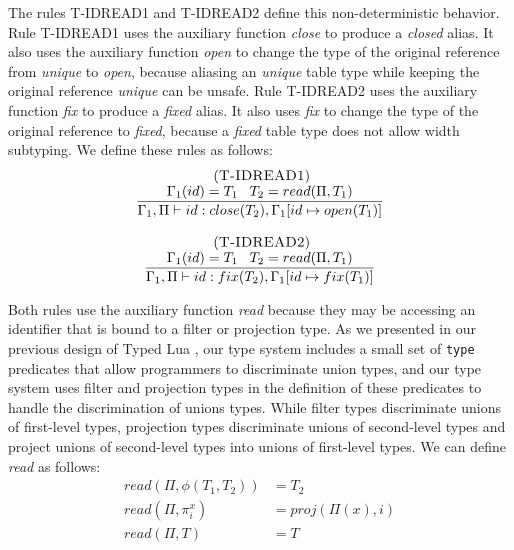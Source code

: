 \documentclass{sigplanconf}
\newcommand{\mylabel}[1]{\; (\textsc{#1})}
\newcommand{\env}{\Gamma}
\newcommand{\penv}{\Pi}
\begin{document}
The rules \textsc{T-IDREAD1} and \textsc{T-IDREAD2} define this non-deterministic behavior.
Rule \textsc{T-IDREAD1} uses the auxiliary function \emph{close} to
produce a \emph{closed} alias.
It also uses the auxiliary function \emph{open} to change the type of
the original reference from \emph{unique} to \emph{open},
because aliasing an \emph{unique} table type while keeping the original
reference \emph{unique} can be unsafe.
Rule \textsc{T-IDREAD2} uses the auxiliary function \emph{fix} to
produce a \emph{fixed} alias.
It also uses \emph{fix} to change the type of the original reference
to \emph{fixed}, because a \emph{fixed} table type does not allow
width subtyping.
We define these rules as follows:
\[
\begin{array}{c}
\begin{array}{c}
\mylabel{T-IDREAD1}\\
\dfrac{\env_{1}(id) = T_{1} \;\;\; T_{2} = read(\penv, T_{1})}
      {\env_{1}, \penv \vdash id:close(T_{2}), \env_{1}[id \mapsto open(T_{1})]}
\end{array}
\\ \\
\begin{array}{c}
\mylabel{T-IDREAD2}\\
\dfrac{\env_{1}(id) = T_{1} \;\;\; T_{2} = read(\penv, T_{1})}
      {\env_{1}, \penv \vdash id:fix(T_{2}), \env_{1}[id \mapsto fix(T_{1})]}
\end{array}
\end{array}
\]

Both rules use the auxiliary function \emph{read} because they may be
accessing an identifier that is bound to a filter or projection type.
As we presented in our previous design of Typed Lua \cite{maidl2014tl},
our type system includes a small set of \texttt{type} predicates that allow
programmers to discriminate union types, and our type system uses filter and
projection types in the definition of these predicates to handle the discrimination
of unions types.
While filter types discriminate unions of first-level types, projection
types discriminate unions of second-level types and project unions of
second-level types into unions of first-level types.
We can define \emph{read} as follows:
\begin{align*}
read(\penv, \phi(T_{1},T_{2})) & = T_{2}\\
read(\penv, \pi_{i}^{x}) & = proj(\penv(x), i)\\
read(\penv, T) & = T
\end{align*}
\end{document}
